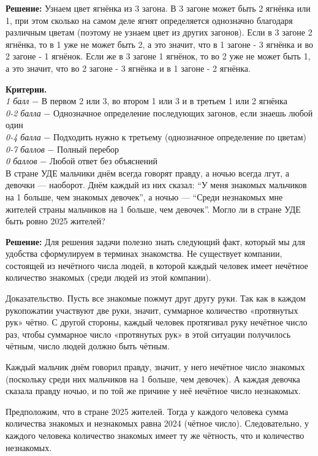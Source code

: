 \textbf{Решение:} Узнаем цвет ягнёнка из 3 загона. В 3 загоне может быть 2 ягнёнка или 1, при этом сколько на самом деле ягнят определяется однозначно благодаря различным цветам (поэтому не узнаем цвет из других загонов). Если в 3 загоне 2 ягнёнка, то в 1 уже не может быть 2, а это значит, что в 1 загоне - 3 ягнёнка и во 2 загоне - 1 ягнёнок. Если же в 3 загоне 1 ягнёнок, то во 2 уже не может быть 1, а это значит, что во 2 загоне - 3 ягнёнка и в 1 загоне - 2 ягнёнка. 

\textbf{Критерии.} \\
\textit{1 балл} $-$ В первом 2 или 3, во втором 1 или 3 и в третьем 1 или 2 ягнёнка\\
\textit{0-2 балла} $-$ Однозначное определение последующих загонов, если знаешь любой один\\
\textit{0-4 балла} $-$ Подходить нужно к третьему (однозначное определение по цветам)\\
\textit{0-7 баллов} $-$ Полный перебор\\
\textit{0 баллов} $-$ Любой ответ без объяснений\\

 В стране УДЕ мальчики днём всегда говорят правду, а ночью всегда лгут, а девочки — наоборот. Днём каждый из них сказал: “У меня знакомых мальчиков на 1 больше, чем знакомых девочек”, а ночью — “Среди незнакомых мне жителей страны мальчиков на 1 больше, чем девочек”. Могло ли в стране УДЕ быть ровно 2025 жителей?

\textbf{Решение:} Для решения задачи полезно знать следующий факт, который мы для удобства сформулируем в терминах знакомства. Не существует компании, состоящей из нечётного числа людей, в которой каждый человек имеет нечётное количество знакомых (среди людей из этой компании).

Доказательство. Пусть все знакомые пожмут друг другу руки. Так как в каждом рукопожатии участвуют две руки, значит, суммарное количество «протянутых рук» чётно. С другой стороны, каждый человек протягивал руку нечётное число раз, чтобы суммарное число «протянутых рук» в этой ситуации получилось чётным, число людей должно быть чётным.

Каждый мальчик днём говорил правду, значит, у него нечётное число знакомых (поскольку среди них мальчиков на 1 больше, чем девочек). А каждая девочка сказала правду ночью, и по той же причине у неё нечётное число незнакомых.

Предположим, что в стране 2025 жителей. Тогда у каждого человека сумма количества знакомых и незнакомых равна 2024 (чётное число). Следовательно, у каждого человека количество знакомых имеет ту же чётность, что и количество незнакомых.

